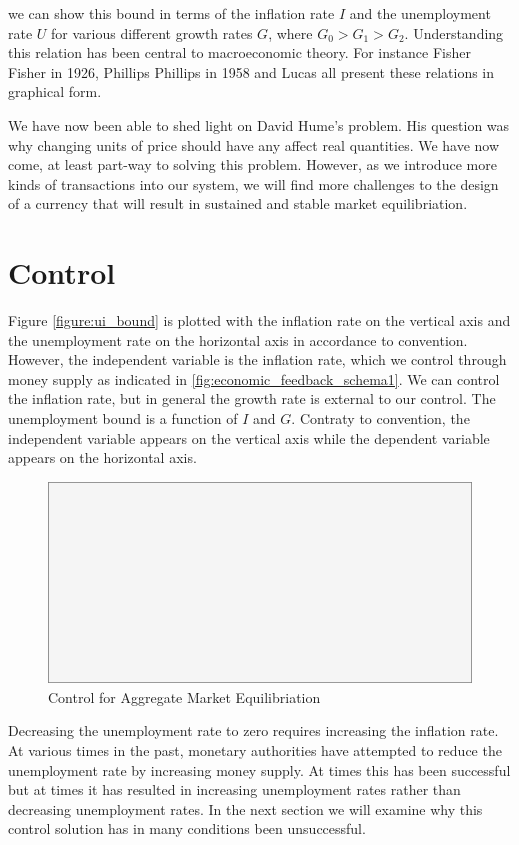 we can show this bound in terms of the inflation
rate $I$ and the unemployment rate $U$ for various different growth rates $G$, where $G_0 > G_1 >
G_2$. Understanding this relation has been central to macroeconomic theory. For instance Fisher
Fisher \cite{fisher1926} in 1926, Phillips Phillips \cite{phillips1958} in 1958 and Lucas
\cite{lucas1996} all present these relations in graphical form.

We have now been able to shed light on David Hume's problem. His question was why changing units of
price should have any affect real quantities. We have now come, at least part-way to solving this
problem. However, as we introduce more kinds of transactions into our system, we will find more
challenges to the design of a currency that will result in sustained and stable market
equilibriation.  

\section{Control}

Figure \ref{figure:ui_bound} is plotted with the inflation rate on the vertical axis and the
unemployment rate on the horizontal axis in accordance to convention. However, the independent
variable is the inflation rate, which we control through money supply as indicated in
\ref{fig:economic_feedback_schema1}. We can control the inflation rate, but in general the growth
rate is external to our control. The unemployment bound is a function of $I$ and $G$. Contraty to
convention, the independent variable appears on the vertical axis while the dependent variable
appears on the horizontal axis. 

\begin{figure}[H]
\centering
\includegraphics[scale=0.48]{blank}
\caption{Control for Aggregate Market Equilibriation}
\label{fig:control_for_equil}
\end{figure}


Decreasing the unemployment rate to zero requires increasing the inflation rate. At various times in
the past, monetary authorities have attempted to reduce the unemployment rate by increasing money
supply. At times this has been successful but at times it has resulted in increasing unemployment
rates rather than decreasing unemployment rates. In the next section we will examine why this
control solution has in many conditions been unsuccessful.
